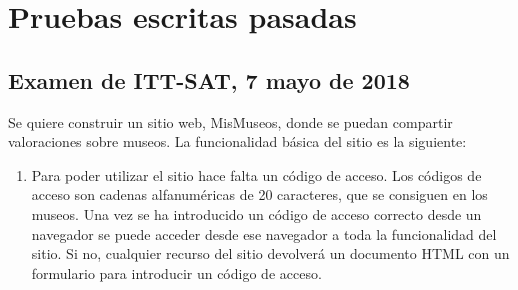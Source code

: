 {

\newpage

\section{Pruebas escritas pasadas}



























\subsection{Examen de ITT-SAT, 7 mayo de 2018}


Se quiere construir un sitio web, MisMuseos, donde se puedan compartir valoraciones sobre museos. La funcionalidad básica del sitio es la siguiente:

\begin{enumerate}
\item Para poder utilizar el sitio hace falta un código de acceso. Los códigos de acceso son cadenas alfanuméricas de 20 caracteres, que se consiguen en los museos. Una vez se ha introducido un código de acceso correcto desde un navegador se puede acceder desde ese navegador a toda la funcionalidad del sitio. Si no, cualquier recurso del sitio devolverá un documento HTML con un formulario para introducir un código de acceso.


\end{enumerate}}
